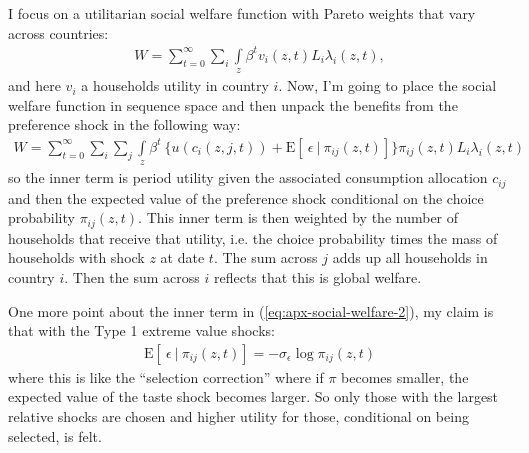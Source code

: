 \documentclass[12pt,pdftex]{article}
\begin{document}
\begin{onehalfspacing}
I focus on a utilitarian social welfare function with Pareto weights that vary across countries:
\begin{align}
W = \sum_{t=0}^{\infty} \sum_{i}  \int\limits_{z} \beta^{t}  v_{i}(z,t) L_{i}\lambda_{i}(z,t),
\label{eq:apx-social-welfare}
\end{align}
and here $v_i$ a households utility in country $i$. Now, I'm going to place the social welfare function in sequence space and then unpack the benefits from the preference shock in the following way:
\begin{align}
W = \sum_{t=0}^{\infty}  \sum_{i}  \sum_{j}  \int\limits_{z}  \beta^{t} \   \bigg \{  u(c_{i}(z, j, t) ) + \mathrm{E}[ \ \epsilon \ | \ \pi_{ij}(z,t) ] \bigg \}\pi_{ij}(z,t) L_{i} \lambda_{i}(z, t)
\label{eq:apx-social-welfare-2}
\end{align}
so the inner term is period utility given the associated consumption allocation $c_{ij}$ and then the expected value of the preference shock conditional on the choice probability $\pi_{ij}(z,t)$. This inner term is then weighted by the number of households that receive that utility, i.e. the choice probability times the mass of households with shock $z$ at date $t$. The sum across $j$ adds up all households in country $i$. Then the sum across $i$ reflects that this is global welfare.

One more point about the inner term in (\ref{eq:apx-social-welfare-2}), my claim is that with the Type 1 extreme value shocks:
\begin{align}
\mathrm{E}[ \ \epsilon \ | \ \pi_{ij}(z,t) ] = -\sigma_{\epsilon} \log \pi_{ij}(z,t)
\end{align}
where this is like the ``selection correction'' where if $\pi$ becomes smaller, the expected value of the taste shock becomes larger. So only those with the largest relative shocks are chosen and higher utility for those, conditional on being selected, is felt.


\end{onehalfspacing}
\end{document}
